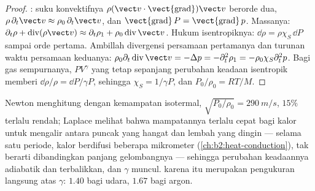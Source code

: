\begin{proof}
: suku konvektifnya $\rho(\vect v\cdot\operatorname{\vect{grad}})\vect v$
berorde dua, $\rho\,\partial_t\vect v \approx \rho_0\,\partial_t\vect v$, dan
$\operatorname{\vect{grad}}P = \operatorname{\vect{grad}}p$. Massanya: $\partial_t\rho +
\operatorname{div}(\rho\vect v) \approx \partial_t\rho_1 + \rho_0\operatorname{div}\vect v$.
Hukum isentropiknya: $\dd\rho = \rho\chi_S\,\dd P$ sampai orde pertama. Ambillah
divergensi persamaan pertamanya dan turunan waktu persamaan keduanya:
$\rho_0\partial_t\operatorname{div}\vect v = -\Delta p = -\partial_t^2\rho_1 = -\rho_0\chi_S
\partial_t^2p$. Bagi gas sempurnanya, $PV^\gamma$ yang tetap sepanjang perubahan
keadaan isentropik memberi $\dd\rho/\rho = \dd P/\gamma P$, sehingga $\chi_S = 1/\gamma P$,
dan $P_0/\rho_0 = RT/M$.
\end{proof}

\begin{remark}\label{rem:b2:sound-waves:laplace}
Newton menghitung  dengan kemampatan isotermal,
$\sqrt{P_0/\rho_0} = \qty{290}{m/s}$, $15\%$ terlalu rendah; Laplace melihat bahwa
mampatannya terlalu cepat bagi kalor untuk mengalir antara puncak yang hangat dan
lembah yang dingin --- selama satu periode, kalor berdifusi beberapa mikrometer
(\cref{ch:b2:heat-conduction}), tak berarti dibandingkan panjang gelombangnya ---
sehingga perubahan keadaannya adiabatik dan terbalikkan, dan $\gamma$ muncul.
 karena itu merupakan pengukuran langsung atas $\gamma$: $1.40$ bagi
udara, $1.67$ bagi argon.
\end{remark}

